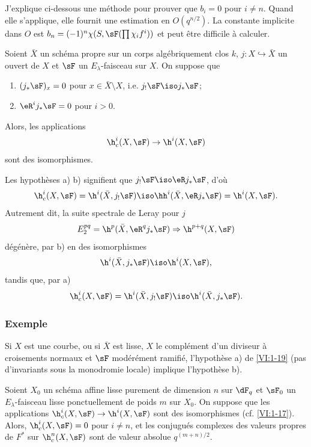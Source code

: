 J'explique ci-dessous une méthode pour prouver que $b_i=0$ pour $i\ne n$. 
Quand elle s'applique, elle fournit une estimation en $O(q^{n/2})$. La constante 
implicite dans $O$ est $b_n=(-1)^n \chi(S,\sF(\prod \chi_i f^i))$ et peut 
être difficile à calculer. 





\begin{proposition_}\label{VI:1-19}
Soient $\bar X$ un schéma propre sur un corps alg\'ebriquement clos $k$, 
$j:X\hookrightarrow \bar X$ un ouvert de $X$ et $\sF$ un $E_\lambda$-faisceau 
sur $X$. On suppose que 
\begin{enumerate}[\indent a)]
  \item $(j_\ast\sF)_x = 0$ pour $x\in \bar X\setminus X$, i.e. 
    $j_!\sF\iso j_\ast\sF$; 
  \item $\eR^i j_\ast \sF = 0$ pour $i>0$.
\end{enumerate}
Alors, les applications 
\[
  \h_c^i(X,\sF) \to \h^i(X,\sF)
\]
sont des isomorphismes. 
\end{proposition_}

Les hypothèses a) b) signifient que $j_! \sF \iso \eR j_\ast \sF$, d'où 
\[
  \h_c^i(X,\sF) = \h^i(\bar X,j_!\sF) \iso \hh^i(\bar X,\eR j_\ast \sF) = \h^i(X,\sF) \text{.}
\]
Autrement dit, la suite spectrale de Leray pour $j$ 
\[
  E_2^{pq} = \h^p(\bar X,\eR^q j_\ast \sF) \Rightarrow \h^{p+q}(X,\sF) 
\]
dégénère, par b) en des isomorphismes 
\[
  \h^i(\bar X,j_\ast\sF) \iso \h^i(X,\sF) \text{,}
\]
tandis que, par a) 
\[
  \h_c^i(X,\sF) = \h^i(\bar X,j_!\sF) \iso \h^i(\bar X,j_\ast\sF) \text{.}
\]





\subsubsection{Exemple}\label{VI:1-19-1}

Si $X$ est une courbe, ou si $\bar X$ est lisse, $X$ le complément d'un 
diviseur à croisements normaux et $\sF$ modérément ramifié, 
l'hypothèse a) de \ref{VI:1-19} (pas d'invariants sous la monodromie locale) 
implique l'hypothèse b). 





\begin{proposition_}\label{VI:1-20}
Soient $X_0$ un schéma affine lisse purement de dimension $n$ sur $\dF_q$ et 
$\sF_0$ un $E_\lambda$-faisceau lisse ponctuellement de poids $m$ sur $X_0$. On 
suppose que les applications $\h_c^i(X,\sF) \to \h^i(X,\sF)$ sont des 
isomorphismes (cf. \ref{VI:1-17}). Alors, $\h_c^i(X,\sF) = 0$ pour $i\ne n$, et 
les conjugués complexes des valeurs propres de $F^\ast$ sur $\h_c^n(X,\sF)$ 
sont de valeur absolue $q^{(m+n)/2}$. 
\end{proposition_}

